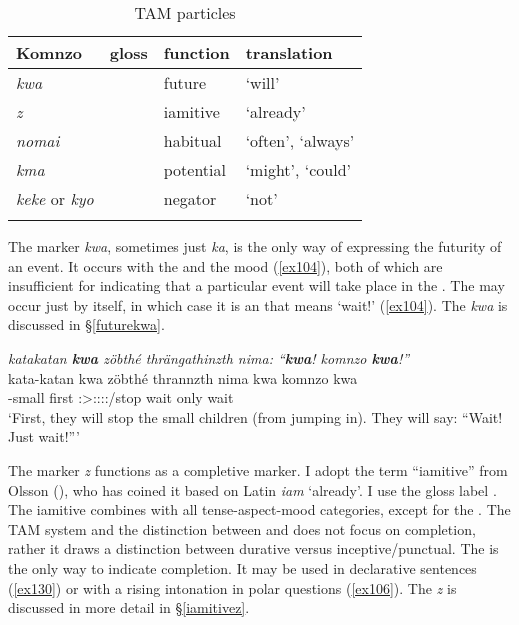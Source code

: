 \begin{table}
\caption{TAM particles}
\label{tam-particles-table}
	\begin{tabularx}{.8\textwidth}{XXXX}
		\lsptoprule
		Komnzo&gloss&function &translation\\
		\midrule
		\emph{kwa}& {\Fut} &future &`will'\\
		\emph{z}& {\Iam} &iamitive &`already'\\
		\emph{nomai}&\Hab{} &habitual &`often', `always'\\
		\emph{kma}&{\Pot} &potential &`might', `could'\\
		\emph{keke} or \emph{kyo}&{\Neg} &negator &`not'\\
		\lspbottomrule
	\end{tabularx}
\end{table}%

The  marker \emph{kwa}, sometimes just \emph{ka}, is the only way of expressing the futurity of an event. It occurs with the   and the  mood (\ref{ex104}), both of which are insufficient for indicating that a particular event will take place in the . The  may occur just by itself, in which case it is an  that means `wait!' (\ref{ex104}). The   \emph{kwa} is discussed in {\S}\ref{futurekwa}.


\begin{exe}
	\ex \emph{katakatan \textbf{kwa} zöbthé thrängathinzth nima: ``\textbf{kwa}! komnzo \textbf{kwa}!''}\\
	\gll kata-katan kwa zöbthé thrannzth nima kwa komnzo kwa\\
	\Redup-small {\Fut} first \Stpl:\Sbj>\Stpl:\Obj:\Irr:\Pfv:\Venit/stop {\Quot} wait only wait\\
	\trans `First, they will stop the small children (from jumping in). They will say: ``Wait! Just wait!''' 
	\label{ex104}
\end{exe}

\largerpage
The  marker \emph{z} functions as a completive marker. I adopt the term ``iamitive'' from Olsson (\citeyear{Olsson:2013vn}), who has coined it based on Latin \emph{iam} `already'. I use the gloss label {\Iam}. The iamitive combines with all tense-aspect-mood categories, except for the . The TAM system and the distinction between  and  does not focus on completion, rather it draws a distinction between durative versus inceptive/punctual. The   is the only way to indicate completion. It may be used in declarative sentences (\ref{ex130}) or with a rising intonation in polar questions (\ref{ex106}). The  \emph{z} is discussed in more detail in {\S}\ref{iamitivez}.

